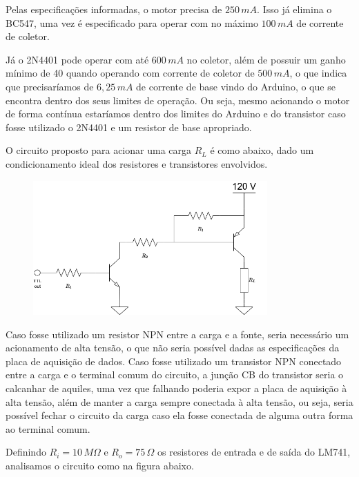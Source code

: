 \documentclass[a4paper]{report}
\begin{document}

Pelas especificações informadas, o motor precisa de $250\,mA$. Isso já elimina o BC547, uma vez é especificado para operar com no máximo $100\,mA$ de corrente de coletor.

Já o 2N4401 pode operar com até $600\,mA$ no coletor, além de possuir um ganho mínimo de 40 quando operando com corrente de coletor de $500\,mA$, o que indica que precisaríamos de $6,25\,mA$ de corrente de base vindo do Arduino, o que se encontra dentro dos seus limites de operação. Ou seja, mesmo acionando o motor de forma contínua estaríamos dentro dos limites do Arduino e do transistor caso fosse utilizado o 2N4401 e um resistor de base apropriado.


O circuito proposto para acionar uma carga $R_L$ é como abaixo, dado um condicionamento ideal dos resistores e transistores envolvidos.

\begin{figure}[H]
    \centering
    \includegraphics[width=0.8\textwidth]{figures/lista1-5.png}
\end{figure}

Caso fosse utilizado um resistor NPN entre a carga e a fonte, seria necessário um acionamento de alta tensão, o que não seria possível dadas as especificações da placa de aquisição de dados. Caso fosse utilizado um transistor NPN conectado entre a carga e o terminal comum do circuito, a junção CB do transistor seria o calcanhar de aquiles, uma vez que falhando poderia expor a placa de aquisição à alta tensão, além de manter a carga sempre conectada à alta tensão, ou seja, seria possível fechar o circuito da carga caso ela fosse conectada de alguma outra forma ao terminal comum.



Definindo $R_i = 10\,M\Omega$ e $R_o = 75\,\Omega$ os resistores de entrada e de saída do LM741, analisamos o circuito como na figura abaixo.
\end{document}
